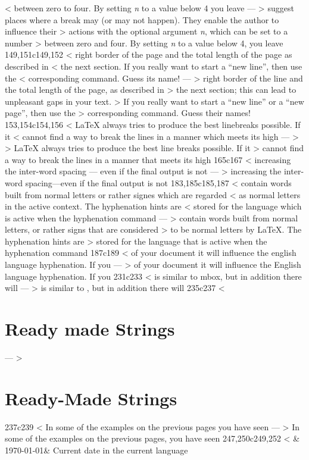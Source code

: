 < between zero to four. By setting \emph{n} to a value below 4 you leave
---
> \noindent suggest places where a break may (or may not happen). They enable the author to influence their
> actions with the optional argument \emph{n}, which can be set to a number
> between zero and four. By setting \emph{n} to a value below 4, you leave
149,151c149,152
< right border of the page and the total length of the page as described in
< the next section. If you really want to start a ``new line'', then use the
< corresponding command. Guess its name!
---
> right border of the line and the total length of the page, as described in
> the next section; this can lead to unpleasant gaps in your text.
> If you really want to start a ``new line'' or a ``new page'', then use the
> corresponding command. Guess their names!
153,154c154,156
< \LaTeX{} always tries to produce the best linebreaks possible. If it
< cannot find a way to break the lines in a manner which meets its high
---
> 
> \LaTeX{} always tries to produce the best line breaks possible. If it
> cannot find a way to break the lines in a manner that meets its high
165c167
< increasing the inter-word spacing --- even if the final output is not
---
> increasing the inter-word spacing---even if the final output is not
183,185c185,187
< contain words built from normal letters or rather signes which are regarded
< as normal letters in the active context. The hyphenation hints are
< stored for the language which is active when the hyphenation command
---
> contain words built from normal letters, or rather signs that are considered
> to be normal letters by \LaTeX{}. The hyphenation hints are
> stored for the language that is active when the hyphenation command
187c189
< of your document it will influence the english language hyphenation. If you
---
> of your document it will influence the English language hyphenation. If you
231c233
<  is similar to mbox, but in addition there will
---
>  is similar to , but in addition there will
235c237
< \section{Ready made Strings}
---
> \section{Ready-Made Strings}
237c239
< In some of the examples on the previous pages you have seen
---
> In some of the examples on the previous pages, you have seen
247,250c249,252
<  & \today   &  Current date in the current language\\
